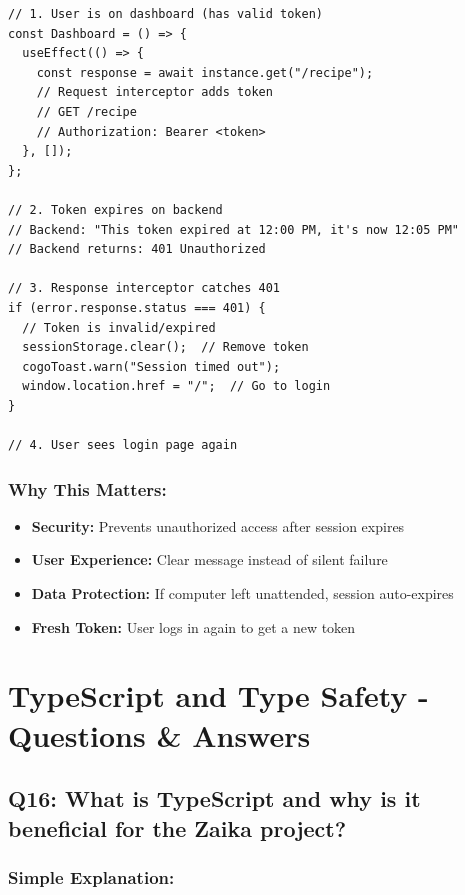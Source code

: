 \documentclass[12pt]{article}
\begin{document}
\begin{lstlisting}
// 1. User is on dashboard (has valid token)
const Dashboard = () => {
  useEffect(() => {
    const response = await instance.get("/recipe");
    // Request interceptor adds token
    // GET /recipe
    // Authorization: Bearer <token>
  }, []);
};

// 2. Token expires on backend
// Backend: "This token expired at 12:00 PM, it's now 12:05 PM"
// Backend returns: 401 Unauthorized

// 3. Response interceptor catches 401
if (error.response.status === 401) {
  // Token is invalid/expired
  sessionStorage.clear();  // Remove token
  cogoToast.warn("Session timed out");
  window.location.href = "/";  // Go to login
}

// 4. User sees login page again
\end{lstlisting}

\subsubsection*{Why This Matters:}

\begin{itemize}
    \item \textbf{Security:} Prevents unauthorized access after session expires
    \item \textbf{User Experience:} Clear message instead of silent failure
    \item \textbf{Data Protection:} If computer left unattended, session auto-expires
    \item \textbf{Fresh Token:} User logs in again to get a new token
\end{itemize}

\section{TypeScript and Type Safety - Questions \& Answers}

\subsection{Q16: What is TypeScript and why is it beneficial for the Zaika project?}

\subsubsection*{Simple Explanation:}
\end{document}
